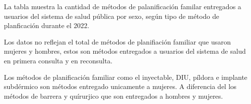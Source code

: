 La tabla muestra la cantidad de métodos de palanificación familar entregados a usuarios del sistema de salud pública por sexo, según tipo de método de planficación durante el 2022. 

Los datos no reflejan el total de métodos de planifiación familiar que usaron mujeres y hombres, estos son métodos entregados a usuarios del sistema de salud en primera consulta y en reconsulta. 

Los métodos de planificación familiar como el inyectable, DIU, píldora e implante subdérmico son métodos entregado unicamente a mujeres. A diferencia del los métodos de barrera y quírurjico que son entregados a hombres y mujeres. 
